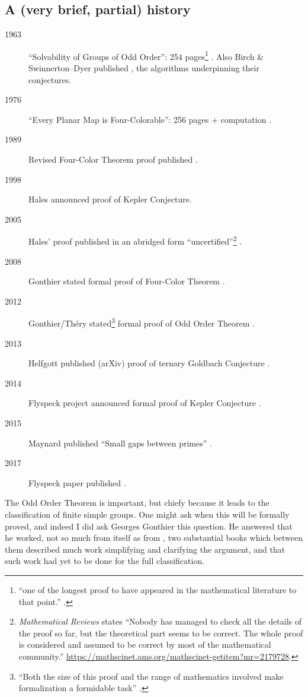 \subsection{A (very brief, partial) history}
\begin{description}
	\item[1963]``Solvability of Groups of Odd Order'': 254 pages\footnote{``one of the longest proof to have appeared in the mathematical literature to that point.'' \cite{Gonthieretal2013a}.} \cite{FeitThompson1963}. Also Birch \& Swinnerton--Dyer published \cite{BirchSwinnertonDyer1963}, the algorithms underpinning their conjectures.
\item[1976]``Every Planar Map is Four-Colorable'': 256 pages + computation \cite{AppelHaken1976a}.
\item[1989]Revised Four-Color Theorem proof published \cite{AppelHaken1989}.
\item[1998]Hales announced proof of Kepler Conjecture.
\item[2005]Hales' proof published in an abridged form ``uncertified''\footnote{\emph{Mathematical Reviews} states ``Nobody has managed to check all the details of the proof so far, but the theoretical part seems to be correct. The whole proof is considered and assumed to be correct by most of the mathematical community.'' \url{https://mathscinet.ams.org/mathscinet-getitem?mr=2179728}.} \cite{Hales2005}.
\item[2008]Gonthier stated formal proof of Four-Color Theorem \cite{Gonthier2008}.
\item[2012]Gonthier/Th\'ery stated\footnote{``Both the size of this proof and the range of mathematics involved make formalization
a formidable task'' \cite{Gonthieretal2013a}.} formal proof of Odd Order Theorem \cite{GonthierThery2012a,Gonthieretal2013a}.
\item[2013]Helfgott published (arXiv) proof of ternary Goldbach Conjecture \cite{Helfgott2013a}.
\item[2014]Flyspeck project announced formal proof of Kepler Conjecture \cite{Hales2014a}.
\item[2015]Maynard published ``Small gaps between primes'' \cite{Maynard2015a}.
\item[2017]Flyspeck paper published \cite{Halesetal2017a}.
\end{description}
The Odd Order Theorem is important, but chiefy because it leads to the classification of finite simple groups. One might ask when this will be formally proved, and indeed I did ask Georges Gonthier this question. He answered that he worked, not so much from \cite{FeitThompson1963} itself as from \cite{Benderetal1994,Peterfalvi2000}, two substantial books which between them described much work simplifying  and clarifying the argument, and that such work had yet to be done for the full classification.
